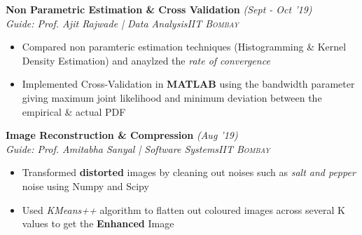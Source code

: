\documentclass{article}
\begin{document}
\vspace{-5pt}
\textbf{Non Parametric Estimation \& Cross Validation} \hfill{\sl \small (Sept - Oct '19)}\\{\it Guide: Prof. Ajit Rajwade | Data Analysis}\hfill{\sl \small \textsc{IIT Bombay}}\\
\vspace{-19pt}
\begin{itemize}[itemsep = -1 mm, leftmargin=*]
  \item Compared non paramteric estimation techniques (Histogramming \& Kernel Density Estimation) and anaylzed the \textit{rate of convergence}
    \item Implemented Cross-Validation in \textbf{MATLAB} using the bandwidth parameter giving maximum joint likelihood and minimum deviation between the empirical \& actual PDF
\end{itemize}
 \vspace{-5pt}
 \textbf{Image Reconstruction \& Compression} \hfill{\sl \small (Aug '19)}\\
 {\it Guide: Prof. Amitabha Sanyal | Software Systems}\hfill{\sl \small \textsc{IIT Bombay}}\\
 \vspace{-19pt}
 \begin{itemize}[itemsep = -1 mm, leftmargin=*]
   \item Transformed {\bf distorted} images by cleaning out noises such as {\it salt and pepper} noise using Numpy and Scipy
   \item Used {\it KMeans++} algorithm to flatten out coloured images across several K values to get the {\bf Enhanced} Image  
 \end{itemize}
\end{document}
